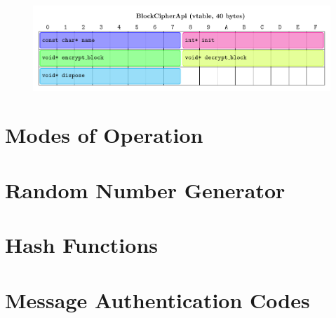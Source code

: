 \documentclass[11pt,a4paper]{report}
\theoremstyle{definitionstyle}
\begin{document}
\begin{figure}[h!]\centering
	\includegraphics[scale=1]{memory_layout/BlockCipherApi.pdf}
\end{figure}

\newpage


\section{Modes of Operation}

\section{Random Number Generator}

\section{Hash Functions}

\section{Message Authentication Codes}
\end{document}
